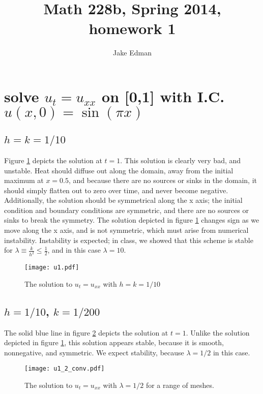 \documentclass[11pt]{amsart}
\title{Math 228b, Spring 2014, homework 1}
\author{Jake Edman}
\date{}                                           %
\begin{document}
\maketitle
\section{solve $u_t = u_{xx}$ on [0,1] with I.C. $u(x,0)= \sin(\pi x)$}
\subsection{$h=k=1/10$}
Figure \ref{u1} depicts the solution at $t=1$.  This solution is clearly very bad, and unstable. Heat should diffuse out along the domain, away from the initial maximum at $x=0.5$, and because there are no sources or sinks in the domain, it should simply flatten out to zero over time, and never become negative.  Additionally, the solution should be symmetrical along the x axis; the initial condition and boundary conditions are symmetric, and there are no sources or sinks to break the symmetry. The solution depicted in figure \ref{u1} changes sign as we move along the x axis, and is not symmetric, which must arise from  numerical instability. Instability is expected; in class, we showed that this scheme is stable for $\lambda \equiv \frac{k}{h^2} \le \frac{1}{2}$, and in this case $\lambda = 10$. 

\begin{figure}[t]
\begin{center} 
\texttt{[image: u1.pdf]}
\caption{The solution to $u_t = u_{xx}$ with  $h=k=1/10$ }
\label{u1} 
\end{center}
\end{figure}
  
\subsection{$h=1/10$, $k=1/200$}
The solid blue line in figure \ref{u2} depicts the solution at $t=1$. Unlike the solution depicted in figure \ref{u1}, this solution appears stable, because it is smooth, nonnegative, and symmetric. We expect stability, because $\lambda = 1/2$ in this case. 

\begin{figure}[t]
\begin{center} 
\texttt{[image: u1\_2\_conv.pdf]}
\caption{The solution to $u_t = u_{xx}$ with $\lambda = 1/2$ for a range of meshes.}
\label{u2} 
\end{center}
\end{figure}
\end{document}
